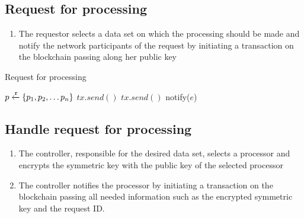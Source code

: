 \subsection{Request for processing}
\label{solution:flow:pr_req}



\begin{enumerate}
  \item The requestor selects a data set on which the processing should be made and  notify the network participants of the request by initiating a transaction on the blockchain passing along her public key
\end{enumerate}

\begin{algorithm}[!htb]
  \caption{Request for processing}\label{alg:data_request}
  \begin{algorithmic}[1]
    \State $p \xleftarrow{\mathtt{r}} \{ p_1, p_2, \dots p_n \}$ 
     
     
    \State $tx.send()$
    \State {}
  \EndFunction
    \State $tx.send()$
    \State {}
  \EndProcedure
     
        \State notify($e$) 
      \EndIf
    \EndWhile
  \EndProcedure
  \end{algorithmic}
\end{algorithm}

\subsection{Handle request for processing}
\label{solution:flow:handle_request}

\begin{enumerate}
  \item The controller, responsible for the desired data set, selects a processor and encrypts the symmetric key with the public key of the selected processor
  \item The controller notifies the processor by initiating a transaction on the blockchain passing all needed information such as the encrypted symmetric key and the request ID.
\end{enumerate}

